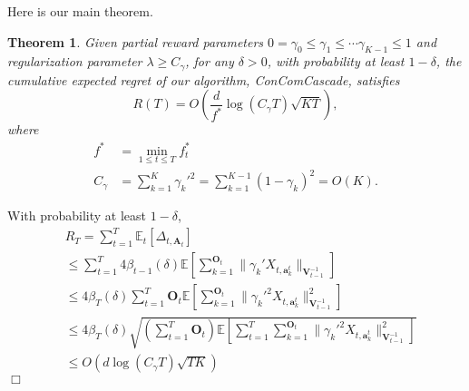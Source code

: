 \documentclass{article}
\newcommand{\EE}{\mathbb{E}}
\newcommand{\bA}{\mathbf{A}}
\newcommand{\ba}{\mathbf{a}}
\newcommand{\bO}{\mathbf{O}}
\newcommand{\bV}{\mathbf{V}}
\newcommand{\norm}[1]{\| #1 \|}
\newtheorem{theorem}{Theorem}[section]
\newenvironment{proof}{\noindent {\textbf{Proof. }}}{$\Box$ \medskip}
\begin{document}
Here is our main theorem.
\begin{theorem}
Given partial reward parameters $0 = \gamma_0 \leq \gamma_1 \leq \cdots \gamma_{K-1} \leq 1$ and regularization parameter $\lambda \geq C_\gamma$, for any $\delta > 0$, with probability at least $1 - \delta$, the cumulative expected regret of our algorithm, {\it ConComCascade}, satisfies
\begin{equation}
R(T) = O(\frac{d}{f^*}\log(C_\gamma T)\sqrt{KT}),
\end{equation}
where
\begin{align*}
f^* &= \min_{1 \leq t \leq T} f_t^*\\
C_\gamma &= \sum_{k=1}^{K} \gamma_k'^2 = \sum_{k=1}^{K-1} (1 - \gamma_k)^2 = O(K).
\end{align*}
\end{theorem}
\begin{proof}
With probability at least $1-\delta$,
\begin{equation}
\begin{split}
&R_T =\sum_{t=1}^{T} \EE_{t}[\Delta_{t, \bA_t}] \\
&\leq \sum_{t=1}^{T} 4 \beta_{t-1}(\delta) \EE[\sum_{k=1}^{\bO_t}\norm{\gamma_k' X_{t,\ba_k^t}}_{\bV_{t-1}^{-1}}]\\
&\leq 4 \beta_T(\delta) \sum_{t=1}^{T} \bO_t \EE[\sum_{k=1}^{\bO_t}\norm{\gamma_k'^2 X_{t,\ba_k^t}}_{\bV_{t-1}^{-1}}^2]\\
&\leq 4 \beta_T(\delta) \sqrt{(\sum_{t=1}^{T} \bO_t) \EE[\sum_{t=1}^{T} \sum_{k=1}^{\bO_t}\norm{\gamma_k'^2 X_{t,\ba_k^t}}_{\bV_{t-1}^{-1}}^2]}  \\
&\leq O(d\log(C_\gamma T)\sqrt{TK})
\end{split}
\end{equation}
\end{proof}
	
\end{document}
